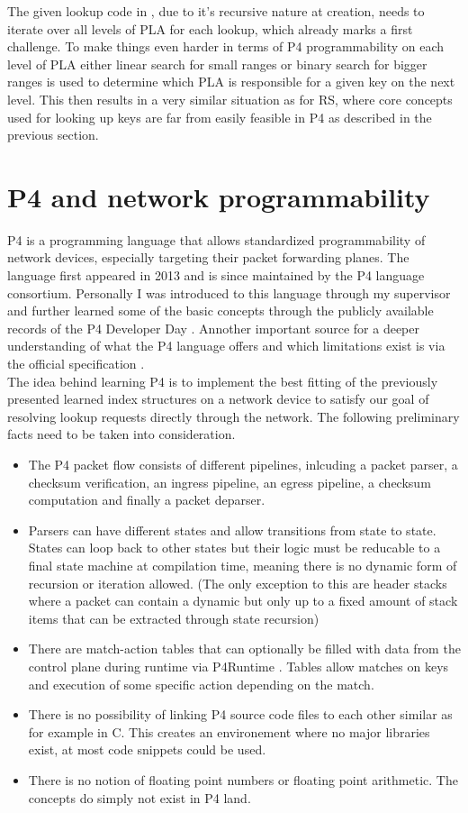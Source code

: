 The given lookup code in \cite{pgm}, due to it's recursive nature at creation, needs to iterate over all levels of PLA for each lookup, which already marks a first challenge. To make things even harder in terms of P4 programmability on each level of PLA either linear search for small ranges or binary search for bigger ranges is used to determine which PLA is responsible for a given key on the next level. This then results in a very similar situation as for RS, where core concepts used for looking up keys are far from easily feasible in P4 as described in the previous section.

\section{P4 and network programmability}
P4 is a programming language that allows standardized programmability of network devices, especially targeting their packet forwarding planes. The language first appeared in 2013 and is since maintained by the P4 language consortium. Personally I was introduced to this language through my supervisor and further learned some of the basic concepts through the publicly available records of the P4 Developer Day \cite{p4-devday}. Annother important source for a deeper understanding of what the P4 language offers and which limitations exist is via the official specification \cite{p4-spec}.\\
The idea behind learning P4 is to implement the best fitting of the previously presented learned index structures on a network device to satisfy our goal of resolving lookup requests directly through the network. The following preliminary facts need to be taken into consideration.

\begin{itemize}
  \item The P4 packet flow consists of different pipelines, inlcuding a packet parser, a checksum verification, an ingress pipeline, an egress pipeline, a checksum computation and finally a packet deparser.
  \item Parsers can have different states and allow transitions from state to state. States can loop back to other states but their logic must be reducable to a final state machine at compilation time, meaning there is no dynamic form of recursion or iteration allowed. (The only exception to this are header stacks where a packet can contain a dynamic but only up to a fixed amount of stack items that can be extracted through state recursion)
  \item There are match-action tables that can optionally be filled with data from the control plane during runtime via P4Runtime \cite{p4runtime-spec}. Tables allow matches on keys and execution of some specific action depending on the match.
  \item There is no possibility of linking P4 source code files to each other similar as for example in C. This creates an environement where no major libraries exist, at most code snippets could be used.
  \item There is no notion of floating point numbers or floating point arithmetic. The concepts do simply not exist in P4 land.
\end{itemize}

